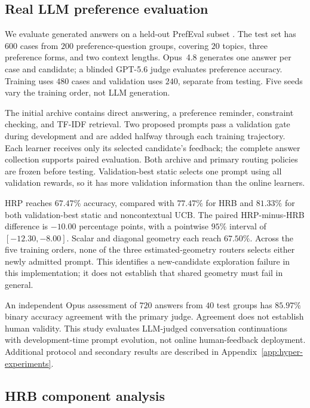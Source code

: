 \documentclass{article} %
\begin{document}
\FloatBarrier
\subsection{Real LLM preference evaluation}
\label{sec:exp-live-llm}

We evaluate generated answers on a held-out PrefEval subset
\citep{zhao2025prefeval}. The test set has $600$ cases from $200$
preference-question groups, covering $20$ topics, three preference forms,
and two context lengths. Opus~4.8 generates one answer per case and
candidate; a blinded GPT-5.6 judge evaluates preference accuracy.
Training uses $480$ cases and validation uses $240$, separate from testing.
Five seeds vary the training order, not LLM generation.

The initial archive contains direct answering, a preference reminder,
constraint checking, and TF-IDF retrieval. Two proposed prompts pass a
validation gate during development and are added halfway through each
training trajectory. Each learner receives only its selected candidate's
feedback; the complete answer collection supports paired evaluation.
Both archive and primary routing policies are frozen before testing.
Validation-best static selects one prompt using all validation rewards,
so it has more validation information than the online learners.



HRP reaches $67.47\%$ accuracy, compared with $77.47\%$ for HRB and
$81.33\%$ for both validation-best static and noncontextual UCB.
The paired HRP-minus-HRB difference is $-10.00$ percentage points, with
a pointwise $95\%$ interval of $[-12.30,-8.00]$.
Scalar and diagonal geometry each reach $67.50\%$.
Across the five training orders, none of the three estimated-geometry
routers selects either newly admitted prompt. This identifies a
new-candidate exploration failure in this implementation; it does not
establish that shared geometry must fail in general.

An independent Opus assessment of $720$ answers from $40$ test groups has
$85.97\%$ binary accuracy agreement with the primary judge. Agreement does
not establish human validity. This study evaluates LLM-judged conversation
continuations with development-time prompt evolution, not online
human-feedback deployment. Additional protocol and secondary results are
described in Appendix~\ref{app:hyper-experiments}.

\subsection{HRB component analysis}
\label{sec:exp-components-main}
\end{document}

